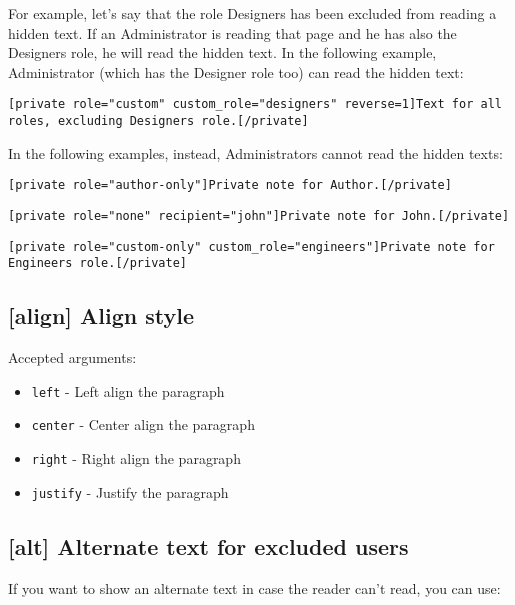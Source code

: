 \documentclass[a4paper,11pt]{article}
\begin{document}
For example, let's say that the role Designers has been excluded from reading a hidden text. If an Administrator is reading that page and he has also the Designers role, he will read the hidden text. In the following example, Administrator (which has the Designer role too) can read the hidden text:

\begin{lstlisting}
[private role="custom" custom_role="designers" reverse=1]Text for all roles, excluding Designers role.[/private]
\end{lstlisting}

In the following examples, instead, Administrators cannot read the hidden texts:

\begin{lstlisting}
[private role="author-only"]Private note for Author.[/private]
\end{lstlisting}

\begin{lstlisting}
[private role="none" recipient="john"]Private note for John.[/private]
\end{lstlisting}

\begin{lstlisting}
[private role="custom-only" custom_role="engineers"]Private note for Engineers role.[/private]
\end{lstlisting}

\subsection{[align] Align style}

Accepted arguments:

\begin{itemize}
 \item \verb+left+ - Left align the paragraph
 \item \verb+center+ - Center align the paragraph
 \item \verb+right+ - Right align the paragraph
 \item \verb+justify+ - Justify the paragraph
\end{itemize}

\subsection{[alt] Alternate text for excluded users}

If you want to show an alternate text in case the reader can't read, you can use:
\end{document}
